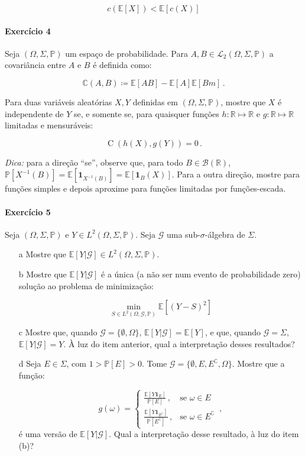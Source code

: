 \documentclass[10pt,a4paper]{article}
\begin{document}
$$c(\mathbb{E}[X])<\mathbb{E}[c(X)]$$

\paragraph{Exercício 4} Seja $(\Omega, \Sigma,\mathbb{P})$ um espaço de probabilidade. Para $A,B \in \mathcal{L}_2(\Omega,\Sigma, \mathbb{P})$ a covariância entre $A$ e $B$ é definida como:

$$\mathbb{C}(A,B) \coloneqq \mathbb{E}[AB] - \mathbb{E}[A] \mathbb{E}[Bm]\, .$$

Para duas variáveis aleatórias $X,Y$ definidas em $(\Omega, \Sigma,\mathbb{P})$, mostre que $X$ é independente de $Y$ se, e somente se, para quaisquer funções $h:\mathbb{R} \mapsto \mathbb{R}$ e $g:\mathbb{R} \mapsto \mathbb{R}$ limitadas e mensuráveis:

$$\operatorname{C}(h(X), g(Y)) = 0\, .$$

\noindent \textit{Dica:} para a direção ``se'', observe que, para todo $B \in \mathcal{B}(\mathbb{R})$, $\mathbb{P}[X^{-1}(B)] = \mathbb{E}[\mathbf{1}_{X^{-1}(B)}] = \mathbb{E}[\mathbf{1}_{B}(X)] $. Para a outra direção, mostre para funções simples e depois aproxime para funções limitadas por funções-escada.

	\paragraph{Exercício 5} Seja $(\Omega, \Sigma, \mathbb{P})$ e $Y \in L^2(\Omega, \Sigma,\mathbb{P})$. Seja $\mathcal{G}$ uma sub-$\sigma$-álgebra de $\Sigma$.
	\begin{itemize}
		\item[a] Mostre que $\mathbb{E}[Y|\mathcal{G}] \in L^2(\Omega, \Sigma,\mathbb{P})$.
		\item[b] Mostre que $\mathbb{E}[Y|\mathcal{G}]$ é a única (a não ser num evento de probabilidade zero) solução ao problema de minimização:
		
		$$\min_{S \in L^2(\Omega,\mathcal{G},\mathbb{P})}\mathbb{E}[(Y-S)^2]$$
		
		\item[c] Mostre que, quando $\mathcal{G} = \{\emptyset, \Omega\}$, $\mathbb{E}[Y|\mathcal{G}] = \mathbb{E}[Y]$, e que, quando $\mathcal{G}=\Sigma$, $\mathbb{E}[Y|\mathcal{G}] = Y$. À luz do item anterior, qual a interpretação desses resultados?
		\item[d] Seja $E \in \Sigma$, com $1> \mathbb{P}[E] > 0$. Tome $\mathcal{G} = \{\emptyset, E, E^\complement, \Omega\}$. Mostre que a função:
		
		$$g(\omega) = \begin{cases}
			\frac{\mathbb{E} [Y\mathbf{1}_E]}{\mathbb{P}[E]}\, , & \text{se } \omega \in E \\
				\frac{\mathbb{E} [Y\mathbf{1}_{E^\complement}]}{\mathbb{P}[E^\complement]}\, , & \text{se } \omega \in E^\complement
		\end{cases}\, ,$$
		é uma versão de $\mathbb{E}[Y|\mathcal{G}]$. Qual a interpretação desse resultado, à luz do item (b)?
			\end{itemize}
\end{document}
